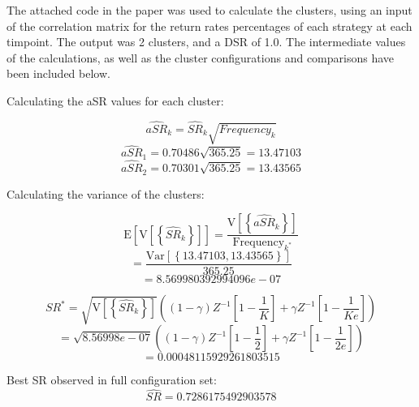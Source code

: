 \documentclass[a4paper,11pt,oneside]{article}
\theoremstyle{plain}
\theoremstyle{definition}
\begin{document}
The attached code in the paper was used to calculate the clusters, using an input of the correlation matrix for the return rates percentages of each strategy at each timpoint. The output was 2 clusters, and a DSR of 1.0. The intermediate values of the calculations, as well as the cluster configurations and comparisons have been included below.\newline

Calculating the aSR values for each cluster:

\begin{equation}
\widehat{aSR}_{k}=\widehat{SR}_{k}\sqrt{{Frequency_{k}}}
\end{equation}
\begin{equation}
\widehat{aSR}_{1}={0.70486}\sqrt{{365.25}}={13.47103}
\end{equation}
\begin{equation}
\widehat{aSR}_{2}={0.70301}\sqrt{{365.25}} ={13.43565}
\end{equation}

Calculating the variance of the clusters:

\begin{equation}
\mathrm{E}\left[\mathrm{V}\left[\left\{\widehat{S R}_{k}\right\}\right]\right]=\frac{\mathrm{V}\left[\left\{\widehat{aSR}_{k}\right\}\right]}{\text {Frequency}_{k^{*}}}
\end{equation}
\begin{equation}
=\frac{\mathrm{Var}\left[\left\{{13.47103,13.43565} \right\}\right]}{\text {365.25}}
\end{equation}
\begin{equation}
={8.569980392994096e-07}
\end{equation}

\begin{equation}
S R^{*}=\sqrt{\mathrm{V}\left[\left\{\widehat{S R}_{k}\right\}\right]}\left((1-\gamma) Z^{-1}\left[1-\frac{1}{K}\right]+\gamma Z^{-1}\left[1-\frac{1}{K e}\right]\right)
\end{equation}
\begin{equation}
=\sqrt{{8.56998e-07}}\left((1-\gamma) Z^{-1}\left[1-\frac{1}{2}\right]+\gamma Z^{-1}\left[1-\frac{1}{2 e}\right]\right)
\end{equation}
\begin{equation}
=0.00048115929261803515
\end{equation}

Best SR observed in full configuration set:
\begin{equation}
\widehat{S R}=0.7286175492903578
\end{equation}
\end{document}
